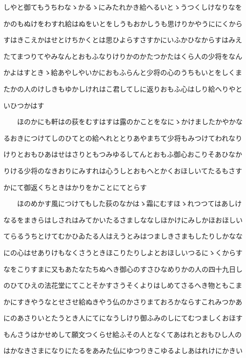 \documentclass[a4paper,11pt,landscape]{ltjtarticle}
\begin{document}
\par\medskip
しやと御てもうちわなゝかるゝにみたれかき給へるいとゝうつくしけなりなを
\par\medskip
かのもぬけをわすれ給はぬをいとをしうもおかしうも思けりかやうににくから
\par\medskip
すはきこえかはせとけちかくとは思ひよらすさすかにいふかひなからすはみえ
\par\medskip
たてまつりてやみなんとおもふなりけりかのかたつかたはくら人の少将をなん
\par\medskip
かよはすときゝ給あやしやいかにおもふらんと少将の心のうちもいとをしくま
\par\medskip
たかの人のけしきもゆかしけれはこ君してしに返りおもふ心はしり給へりやと
\par\medskip
いひつかはす
\par\medskip
　　ほのかにも軒はの荻をむすはすは露のかことをなにゝかけましたかやかな
\par\medskip
るおきにつけてしのひてとの給へれととりあやまちて少将もみつけてわれなり
\par\medskip
けりとおもひあはせはさりともつみゆるしてんとおもふ御心おこりそあひなか
\par\medskip
りける少将のなきおりにみすれは心うしとおもへとかくおほしいてたるもさす
\par\medskip
かにて御返くちときはかりをかことにてとらす
\par\medskip
　　ほのめかす風につけてもした荻のなかはゝ霜にむすほゝれつつてはあしけ
\par\medskip
なるをまきらはしされはみてかいたるさましななしほかけにみしかほおほしい
\par\medskip
てらるうちとけてむかひゐたる人はえうとみはつましきさまもしたりしかなな
\par\medskip
にの心はせありけもなくさうときほこりたりしよとおほしいつるにゝくからす
\par\medskip
なをこりすまに又もあたなたちぬへき御心のすさひなめりかの人の四十九日し
\par\medskip
のひてひえの法花堂にてことそかすさうそくよりはしめてさるへき物ともこま
\par\medskip
かにすきやうなとせさせ給ぬきやう仏のかさりまておろかならすこれみつかあ
\par\medskip
にのあさりいとたうとき人にてになうしけり御ふみのしにてむつましくおほす
\par\medskip
もんさうはかせめして願文つくらせ給ふその人となくてあはれとおもひし人の
\par\medskip
はかなきさまになりにたるをあみた仏にゆつりきこゆるよしあはれけにかきい
\end{document}
